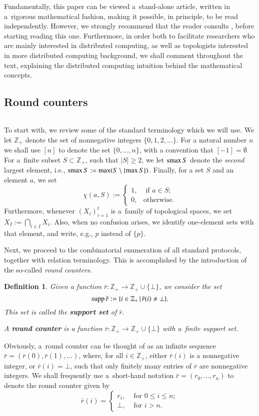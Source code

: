 \documentclass{amsart}[10pt]
\newtheorem{df}[theorem]{Definition}
\newcommand{\es}{\emptyset}
\newcommand{\smax}{\text{\rm smax}\,}
\newcommand{\supp}{\text{\rm supp}\,}
\newcommand{\tr}{{\bar r}}
\newcommand{\zz}{{\mathbb Z}}
\numberwithin{equation}{section}
\numberwithin{figure}{section}
\numberwithin{table}{section}
\begin{document}
Fundamentally, this paper can be viewed a~stand-alone article, written
in a~rigorous mathematical fashion, making it possible, in principle,
to be read independently. However, we strongly recommend that the
reader consults \cite{k1}, before starting reading this
one. Furthermore, in order both to facilitate researchers who are
mainly interested in distributed computing, as well as topologists
interested in more distributed computing background, we shall comment
throughout the text, explaining the distributed computing intuition
behind the mathematical concepts.

\subsection{Round counters} $\,$

\nin To start with, we review some of the standard terminology which
we will use. We let $\zz_+$ denote the set of nonnegative integers
$\{0,1,2,\dots\}$.  For a natural number $n$ we shall use $[n]$ to
denote the set $\{0,\dots,n\}$, with a convention that $[-1]=\es$.
For a~finite subset $S\subset\zz_+$, such that $|S|\geq 2$, we let
$\smax S$ denote the {\it second} largest element, i.e., $\smax
S:=\max(S\setminus\{\max S\})$. Finally, for a set $S$ and an element
$a$, we set
\[\chi(a,S):=
\begin{cases}
1, & \text{ if } a\in S;\\
0, & \text {otherwise.} 
\end{cases}\]
\nin Furthermore, whenever $(X_i)_{i=1}^t$ is a~family of topological
spaces, we set $X_I:=\bigcap_{i\in I} X_i$.  Also, when no confusion
arises, we identify one-element sets with that element, and write,
e.g., $p$ instead of $\{p\}$.


Next, we proceed to the combinatorial enumeration of all standard
protocols, together with relation terminology. This is accomplished by
the introduction of the so-called {\it round counters}.

\begin{df}
Given a function $\tr:\zz_+\rightarrow\zz_+\cup\{\bot\}$, we consider
the set
\[\supp\tr:=\{i\in\zz_+\,|\,\tr(i)\neq\bot\}.\] 
This set is called the {\bf support set} of $\tr$.

\nin A {\bf round counter} is a function
$\tr:\zz_+\rightarrow\zz_+\cup\{\bot\}$ with a~finite support set.
\end{df}

Obviously, a~round counter can be thought of as an infinite sequence
$\tr=(\tr(0),\tr(1),\dots)$, where, for all $i\in\zz_+$, either
$\tr(i)$ is a nonnegative integer, or $\tr(i)=\bot$, such that only
finitely many entries of $\tr$ are nonnegative integers. We shall
frequently use a~short-hand notation $\tr=(r_0,\dots,r_n)$ to denote
the round counter given by
\[\tr(i)=\begin{cases}
r_i, & \text{ for } 0\leq i\leq n;\\
\bot,& \text{ for } i>n.
\end{cases}\]
\end{document}
